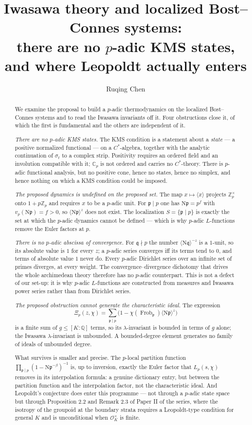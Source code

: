 \documentclass[11pt]{amsart}
\title[No $p$-adic KMS states]{Iwasawa theory and localized Bost--Connes systems:\\ there are no $p$-adic KMS states,\\ and where Leopoldt actually enters}
\author{Ruqing Chen}
\date{}
\numberwithin{equation}{section}
\theoremstyle{definition}
\theoremstyle{remark}
\newcommand{\Z}{\mathbb{Z}}
\newcommand{\Q}{\mathbb{Q}}
\newcommand{\Cp}{\mathbb{C}_p}
\newcommand{\cO}{\mathcal{O}}
\newcommand{\pp}{\mathfrak{p}}
\newcommand{\qq}{\mathfrak{q}}
\newcommand{\Ns}{\mathrm{N}}
\newcommand{\Frob}{\operatorname{Frob}}
\begin{document}
\begin{abstract}
We examine the proposal to build a $p$-adic thermodynamics on the localized Bost--Connes
systems and to read the Iwasawa invariants off it. Four obstructions close it, of which the
first is fundamental and the others are independent of it.

\emph{There are no $p$-adic KMS states.} The KMS condition is a statement about a
\emph{state} --- a positive normalized functional --- on a $C^*$-algebra, together with the
analytic continuation of $\sigma_t$ to a complex strip. Positivity requires an ordered field
and an involution compatible with it; $\Cp$ is not ordered and carries no $C^*$-theory. There
is $p$-adic functional analysis, but no positive cone, hence no states, hence no simplex, and
hence nothing on which a KMS condition could be imposed.

\emph{The proposed dynamics is undefined on the proposed set.} The map $x\mapsto\langle x\rangle$
projects $\Z_p^\times$ onto $1+p\Z_p$ and requires $x$ to be a $p$-adic unit. For
$\pp\mid p$ one has $\Ns\pp=p^{f}$ with $v_p(\Ns\pp)=f>0$, so $\langle\Ns\pp\rangle^z$ does
not exist. The localization $S=\{\pp\mid p\}$ is exactly the set at which the $p$-adic
dynamics cannot be defined --- which is why $p$-adic $L$-functions remove the Euler factors
at $p$.

\emph{There is no $p$-adic abscissa of convergence.} For $\qq\nmid p$ the number
$\langle\Ns\qq\rangle^{-z}$ is a $1$-unit, so its absolute value is $1$ for every $z$;
a $p$-adic series converges iff its terms tend to $0$, and terms of absolute value $1$ never
do. Every $p$-adic Dirichlet series over an infinite set of primes diverges, at every weight.
The convergence--divergence dichotomy that drives the whole archimedean theory therefore has
no $p$-adic counterpart. This is not a defect of our set-up: it is why $p$-adic
$L$-functions are constructed from measures and Iwasawa power series rather than from
Dirichlet series.

\emph{The proposed obstruction cannot generate the characteristic ideal.} The expression
\[
\Xi_p(z,\chi)=\sum_{\pp\mid p}\bigl(1-\chi(\Frob_\pp)\langle\Ns\pp\rangle^z\bigr)
\]
is a finite sum of $g\le[K:\Q]$ terms, so its $\lambda$-invariant is bounded in terms of $g$
alone; the Iwasawa
$\lambda$-invariant is unbounded. A bounded-degree element generates no family of ideals of
unbounded degree.

What survives is smaller and precise. The $p$-local partition function
$\prod_{\pp\mid p}(1-\Ns\pp^{-\beta})^{-1}$ is, up to inversion, exactly the Euler factor that
$L_p(s,\chi)$ removes in its interpolation formula: a genuine dictionary entry, but between
the partition function and the interpolation factor, not the characteristic ideal. And
Leopoldt's conjecture does enter this programme --- not through a $p$-adic state space but
through Proposition 2.2 and Remark 2.3 of Paper II of the series, where the isotropy of the
groupoid at the boundary strata
requires a Leopoldt-type condition for general $K$ and is unconditional when $\cO_K^\times$
is finite.
\end{abstract}
\end{document}
